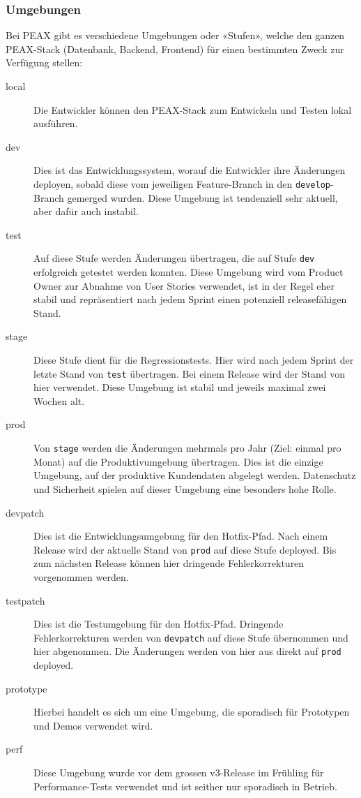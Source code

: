 \subsubsection{Umgebungen}

Bei PEAX gibt es verschiedene Umgebungen oder «Stufen», welche den ganzen PEAX-Stack (Datenbank, Backend, Frontend) für einen bestimmten Zweck zur Verfügung stellen:

\begin{description}
    \item[local] Die Entwickler können den PEAX-Stack zum Entwickeln und Testen lokal ausführen.
    \item[dev] Dies ist das Entwicklungssystem, worauf die Entwickler ihre Änderungen deployen, sobald diese vom jeweiligen Feature-Branch in den \texttt{develop}-Branch gemerged wurden. Diese Umgebung ist tendenziell sehr aktuell, aber dafür auch instabil.
    \item[test] Auf diese Stufe werden Änderungen übertragen, die auf Stufe \texttt{dev} erfolgreich getestet werden konnten. Diese Umgebung wird vom Product Owner zur Abnahme von User Stories verwendet, ist in der Regel eher stabil und repräsentiert nach jedem Sprint einen potenziell releasefähigen Stand.
    \item[stage] Diese Stufe dient für die Regressionstests. Hier wird nach jedem Sprint der letzte Stand von \texttt{test} übertragen. Bei einem Release wird der Stand von hier verwendet. Diese Umgebung ist stabil und jeweils maximal zwei Wochen alt.
    \item[prod] Von \texttt{stage} werden die Änderungen mehrmals pro Jahr (Ziel: einmal pro Monat) auf die Produktivumgebung übertragen. Dies ist die einzige Umgebung, auf der produktive Kundendaten abgelegt werden. Datenschutz und Sicherheit spielen auf dieser Umgebung eine besonders hohe Rolle.
    \item[devpatch] Dies ist die Entwicklungsumgebung für den Hotfix-Pfad. Nach einem Release wird der aktuelle Stand von \texttt{prod} auf diese Stufe deployed. Bis zum nächsten Release können hier dringende Fehlerkorrekturen vorgenommen werden.
    \item[testpatch] Dies ist die Testumgebung für den Hotfix-Pfad. Dringende Fehlerkorrekturen werden von \texttt{devpatch} auf diese Stufe übernommen und hier abgenommen. Die Änderungen werden von hier aus direkt auf \texttt{prod} deployed.
    \item[prototype] Hierbei handelt es sich um eine Umgebung, die sporadisch für Prototypen und Demos verwendet wird.
    \item[perf] Diese Umgebung wurde vor dem grossen v3-Release im Frühling für Performance-Tests verwendet und ist seither nur sporadisch in Betrieb.
\end{description}

